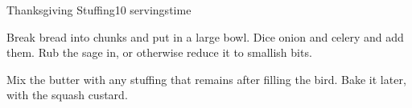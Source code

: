 \documentclass[../Cookbook.tex]{subfiles}
\begin{document}
\begin{recipe}[Stuffing]{Thanksgiving Stuffing}{10 servings}{time}

	Break bread into chunks and put in a large bowl. Dice onion and celery and add them. Rub the sage in, or otherwise reduce it to smallish bits.

	Mix the butter with any stuffing that remains after filling the bird. Bake it later, with the squash custard.

\end{recipe}
\end{document}
